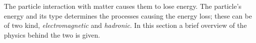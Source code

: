 The particle interaction with matter causes them to lose energy. The particle's
energy and its type determines the processes causing the energy loss; these can
be of two kind, \emph{electromagnetic} and \emph{hadronic}. In this section a
brief overview of the physics behind the two is given.
